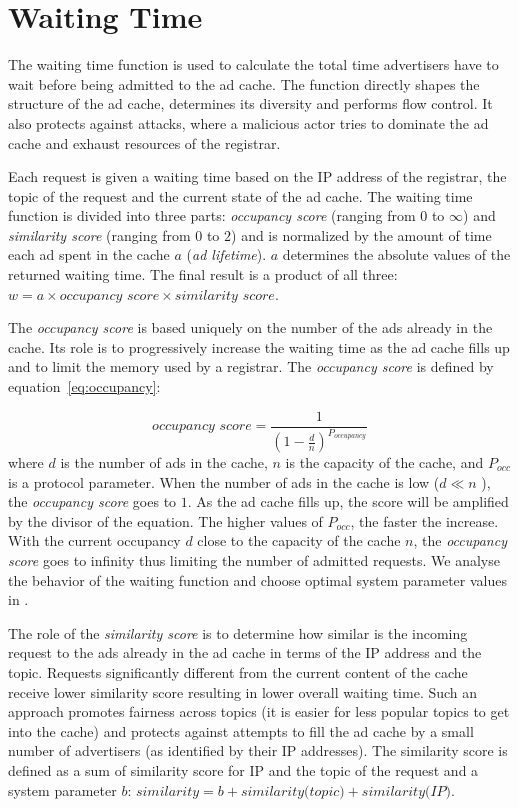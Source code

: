\section{Waiting Time}
\label{sec:waitingTime}

The waiting time function is used to calculate the total time advertisers have to wait before being admitted to the ad cache. 
The function directly shapes the structure of the ad cache,  determines its diversity and performs flow control. 
It also protects against attacks, where a malicious actor tries to dominate the ad cache and exhaust resources of the registrar. 

Each request is given a waiting time based on the IP address of the registrar, the topic of the request and the current state of the ad cache. 
The waiting time function is divided into three parts: \emph{occupancy score} (ranging from $0$ to $\infty$) and  \emph{similarity score} (ranging from $0$ to $2$) and is normalized by the amount of time each ad spent in the cache $a$ (\ie \emph{ad lifetime}). $a$ determines the absolute values of the returned waiting time. The final result is a product of all three: $w = a \times \textit{occupancy score} \times \textit{similarity score}.$

The \emph{occupancy score} is based uniquely on the number of the ads already in the cache.
Its role is to progressively increase the waiting time as the ad cache fills up and to limit the memory used by a registrar.
The \emph{occupancy score} is defined by equation~\ref{eq:occupancy}:

\begin{equation}
\label{eq:occupancy}
    \textit{occupancy score} = \frac{1}{(1-\frac{d}{n})^{P_{occupancy}}}
\end{equation}
where $d$ is the number of ads in the cache, $n$ is the capacity of the cache, and $P_\textit{occ}$ is a protocol parameter. 
When the number of ads in the cache is low ($d \ll n$ ), the \emph{occupancy score} goes to $1$. 
As the ad cache fills up, the score will be amplified by the divisor of the equation. 
The higher values of $P_\textit{occ}$, the faster the increase. 
With the current occupancy $d$ close to the capacity of the cache $n$, the \emph{occupancy score} goes to infinity thus limiting the number of admitted requests. We analyse the behavior of the waiting function and choose optimal system parameter values in .

The role of the \emph{similarity score} is to determine how similar is the incoming request to the ads already in the ad cache in terms of the IP address and the topic. 
Requests significantly different from the current content of the cache receive lower similarity score resulting in lower overall waiting time. 
Such an approach promotes fairness across topics (it is easier for less popular topics to get into the cache) and protects against attempts to fill the ad cache by a small number of advertisers (as identified by their IP addresses). The similarity score is defined as a sum of similarity score for IP and the topic of the request and a system parameter $b$: $\textit{similarity} = b + \textit{similarity(topic)} + \textit{similarity(IP)}$. 

